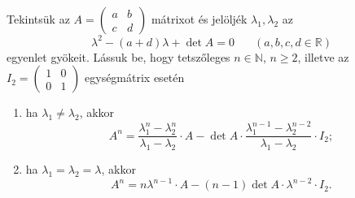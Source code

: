 \begin{extraproblem}
Tekintsük az ${\displaystyle {A=\begin{pmatrix}a & b\\
c & d
\end{pmatrix}}}$ mátrixot és jelöljék $\lambda_{1},\lambda_{2}$ az 
\[
\lambda^{2}-(a+d)\lambda+\det A=0\phantom{xxx}(a,b,c,d\in\mathbb{R})
\]
egyenlet gyökeit. Lássuk be, hogy tetszőleges $n\in\mathbb{N}$, $n\geq2$,
illetve az ${\displaystyle {I_{2}=\begin{pmatrix}1 & 0\\
0 & 1
\end{pmatrix}}}$ egységmátrix esetén 
\begin{enumerate}
\item ha $\lambda_{1}\neq\lambda_{2}$, akkor 
\[
{\displaystyle {A^{n}=\frac{\lambda_{1}^{n}-\lambda_{2}^{n}}{\lambda_{1}-\lambda_{2}}\cdot A-\det A\cdot\frac{\lambda_{1}^{n-1}-\lambda_{2}^{n-2}}{\lambda_{1}-\lambda_{2}}\cdot I_{2};}}
\]
\item ha $\lambda_{1}=\lambda_{2}=\lambda$, akkor 
\[
{\displaystyle {A^{n}=n\lambda^{n-1}\cdot A-(n-1)\det A\cdot\lambda^{n-2}\cdot I_{2}.}}
\]
\end{enumerate}
\end{extraproblem}

